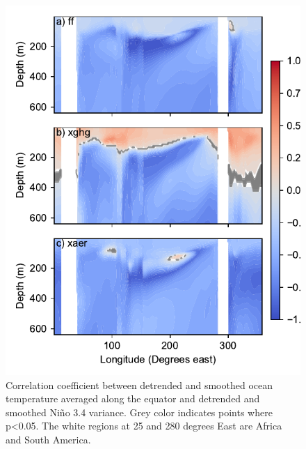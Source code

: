 \documentclass[11pt]{article}
\begin{document}
\begin{figure}[htbp]
\centering
\includegraphics[width=.9\linewidth]{./figures/tempdt.pdf}
\caption{\label{fig:tempdt}Correlation coefficient between detrended and smoothed ocean temperature averaged along the equator and detrended and smoothed Niño 3.4 variance. Grey color indicates points where p<0.05. The white regions at 25 and 280 degrees East are Africa and South America.}
\end{figure}
\end{document}
